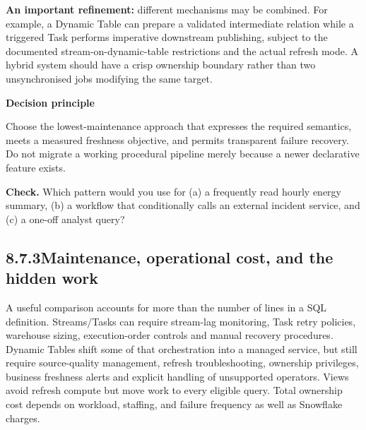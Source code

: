 \documentclass[11pt,twoside]{article}
\newcommand{\topic}[2]{\subsection*{#1\quad #2}}
\begin{document}
\textbf{An important refinement:} different mechanisms may be combined. For example, a Dynamic Table can prepare a validated intermediate relation while a triggered Task performs imperative downstream publishing, subject to the documented stream-on-dynamic-table restrictions and the actual refresh mode. A hybrid system should have a crisp ownership boundary rather than two unsynchronised jobs modifying the same target.
\begin{insight}\textbf{Decision principle}\par
Choose the lowest-maintenance approach that expresses the required semantics, meets a measured freshness objective, and permits transparent failure recovery. Do not migrate a working procedural pipeline merely because a newer declarative feature exists.\end{insight}
\textbf{Check.} Which pattern would you use for (a) a frequently read hourly energy summary, (b) a workflow that conditionally calls an external incident service, and (c) a one-off analyst query?
\newpage
\topic{8.7.3}{Maintenance, operational cost, and the hidden work}
A useful comparison accounts for more than the number of lines in a SQL definition. Streams/Tasks can require stream-lag monitoring, Task retry policies, warehouse sizing, execution-order controls and manual recovery procedures. Dynamic Tables shift some of that orchestration into a managed service, but still require source-quality management, refresh troubleshooting, ownership privileges, business freshness alerts and explicit handling of unsupported operators. Views avoid refresh compute but move work to every eligible query. Total ownership cost depends on workload, staffing, and failure frequency as well as Snowflake charges.
\end{document}

